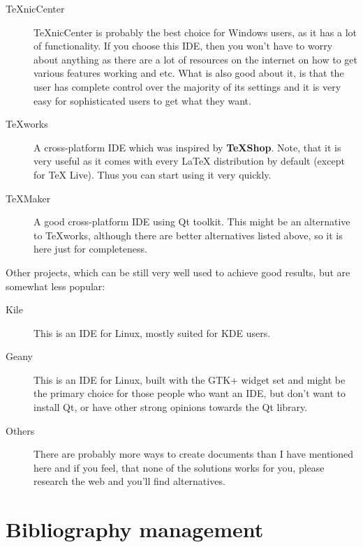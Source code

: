 \documentclass[
    draft
]{scrartcl}
\begin{document}
\begin{description}
    \item[\TeX{}nicCenter] 
        \TeX{}nicCenter is probably the best choice for Windows users, as it has
            a lot of functionality.
        If you choose this IDE, then you won't have to worry about anything as
            there are a lot of resources on the internet on how to get various
            features working and etc.
        What is also good about it, is that the user has complete control over
            the majority of its settings and it is very easy for sophisticated
            users to get what they want.

    \item[\TeX{}works]
        A cross-platform IDE which was inspired by \textbf{TeXShop}.
        Note, that it is very useful as it comes with every \LaTeX{}
            distribution by default (except for \TeX{} Live).
        Thus you can start using it very quickly.

    \item[\TeX{}Maker]
        A good cross-platform IDE using Qt toolkit.
        This might be an alternative to \TeX{}works, although there are better
            alternatives listed above, so it is here just for completeness.
\end{description}

Other projects, which can be still very well used to achieve good results, but
    are somewhat less popular:
%
\begin{description}
    \item[Kile]
        This is an IDE for Linux, mostly suited for KDE users.
    \item[Geany]
        This is an IDE for Linux, built with the GTK+ widget set and might be
            the primary choice for those people who want an IDE, but don't want
            to install Qt, or have other strong opinions towards the Qt library.
    \item[Others]
        There are probably more ways to create  documents than I have
            mentioned here and if you feel, that none of the solutions works for
            you, please research the web and you'll find alternatives.
\end{description}

\section{Bibliography management}
\end{document}
